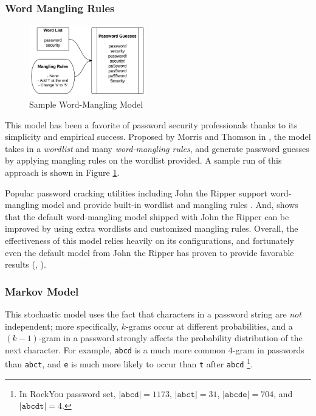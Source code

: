 \documentclass{article} %
\theoremstyle{definition}
\theoremstyle{theorem}
\theoremstyle{remark}
\theoremstyle{remark}
\begin{document}
\subsubsection{Word Mangling Rules}

\begin{figure}
    \vspace{-30pt}
    \begin{center}
        \includegraphics[width=0.45\textwidth]{diag/word_mangling.png}
    \end{center}
    \vspace{-10pt}
    \caption{Sample Word-Mangling Model}
    \vspace{-20pt}
    \label{fig:word-mangling}
\end{figure}

\par\quad This model has been a favorite of password security professionals thanks to its simplicity and empirical success. Proposed by Morris and Thomson in \cite{history}, the model takes in a \emph{wordlist} and many \emph{word-mangling rules}, and generate password guesses by applying mangling rules on the wordlist provided. A sample run of this approach is shown in Figure \ref{fig:word-mangling}.

\par\quad Popular password cracking utilities including John the Ripper support word-mangling model and provide built-in wordlist and mangling rules \cite{john}. And, \cite{empirical} shows that the default word-mangling model shipped with John the Ripper can be improved by using extra wordlists and customized mangling rules. Overall, the effectiveness of this model relies heavily on its configurations, and fortunately even the default model from John the Ripper has proven to provide favorable results (\cite{pcfg-smoothing}, \cite{mangled2}).

\subsubsection{Markov Model}
\par\quad This stochastic model uses the fact that characters in a password string are \emph{not} independent; more specifically, $k$-grams occur at different probabilities, and a $(k-1)$-gram in a password strongly affects the probability distribution of the next character. For example, \texttt{abcd} is a much more common $4$-gram in passwords than \texttt{abct}, and \texttt{e} is much more likely to occur than \texttt{t} after \texttt{abcd} \footnote{In RockYou password set, $|\texttt{abcd}| = 1173$, $|\texttt{abct}| = 31$, $|\texttt{abcde}| = 704$, and $|\texttt{abcdt}| = 4$.}.
\end{document}
